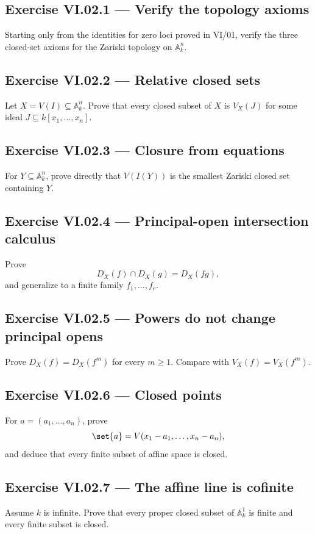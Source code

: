 
\subsection*{Exercise VI.02.1 --- Verify the topology axioms}
\label{ex:vi02-1}
Starting only from the identities for zero loci proved in VI/01, verify the three closed-set
axioms for the Zariski topology on \(\mathbb A_k^n\).

\subsection*{Exercise VI.02.2 --- Relative closed sets}
\label{ex:vi02-2}
Let \(X=V(I)\subseteq\mathbb A_k^n\).  Prove that every closed subset of \(X\) is
\(V_X(J)\) for some ideal \(J\subseteq k[x_1,\dots,x_n]\).

\subsection*{Exercise VI.02.3 --- Closure from equations}
\label{ex:vi02-3}
For \(Y\subseteq\mathbb A_k^n\), prove directly that \(V(I(Y))\) is the smallest Zariski
closed set containing \(Y\).

\subsection*{Exercise VI.02.4 --- Principal-open intersection calculus}
\label{ex:vi02-4}
Prove
\[
D_X(f)\cap D_X(g)=D_X(fg),
\]
and generalize to a finite family \(f_1,\dots,f_r\).

\subsection*{Exercise VI.02.5 --- Powers do not change principal opens}
\label{ex:vi02-5}
Prove \(D_X(f)=D_X(f^m)\) for every \(m\ge1\).  Compare with
\(V_X(f)=V_X(f^m)\).

\subsection*{Exercise VI.02.6 --- Closed points}
\label{ex:vi02-6}
For \(a=(a_1,\dots,a_n)\), prove
\[
\set{a}=V(x_1-a_1,\dots,x_n-a_n),
\]
and deduce that every finite subset of affine space is closed.

\subsection*{Exercise VI.02.7 --- The affine line is cofinite}
\label{ex:vi02-7}
Assume \(k\) is infinite.  Prove that every proper closed subset of \(\mathbb A_k^1\) is
finite and every finite subset is closed.


